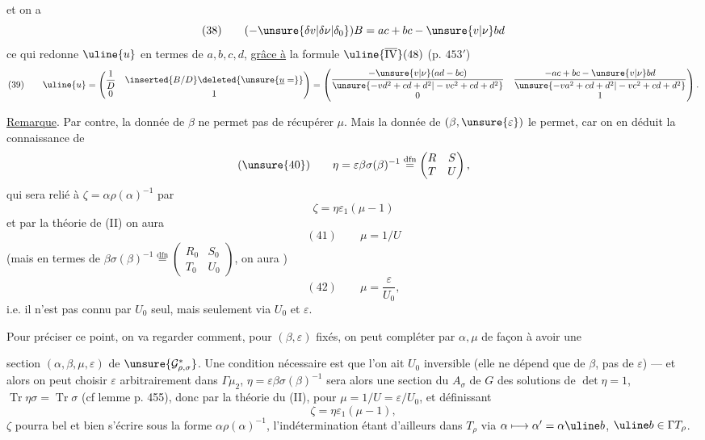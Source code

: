 et on a
\[
(38)\qquad (-\unsure{\delta v|\delta\nu|\delta_0})B=ac+bc-\unsure{v|\nu}bd
\]
ce qui redonne $\uline{u}$ en termes de $a,b,c,d$, \uline{grâce à} la formule $\uline{\overline{\mathrm{IV}}}(48)$ (p. $453'$)
\[
(39)\qquad \uline{u}=\begin{pmatrix}\dfrac1D&\inserted{B/D}\deleted{\unsure{\underline u=}}\\0&1\end{pmatrix}
=\begin{pmatrix}
\dfrac{-\unsure{v|\nu}(ad-bc)}{\unsure{-vd^2+cd+d^2|-vc^2+cd+d^2}}&\dfrac{-ac+bc-\unsure{v|\nu}bd}{\unsure{-va^2+cd+d^2|-vc^2+cd+d^2}}\\0&1
\end{pmatrix}.
\]

\uline{Remarque}. Par contre, la donnée de $\beta$   ne permet pas de récupérer $\mu$. Mais la donnée de $(\beta,\unsure{\varepsilon})$ le permet, car on en déduit la connaissance de
\[
(\unsure{40})\qquad \eta=\varepsilon\beta\sigma(\beta)^{-1}\overset{\mathrm{dfn}}=\begin{pmatrix}R&S\\T&U\end{pmatrix},
\]
qui sera relié à $\zeta=\alpha\rho(\alpha)^{-1}$ par
\[
\zeta=\eta\varepsilon_1(\mu-1)
\]
et par la théorie de (II) on aura
\[
(41)\qquad \mu=1/U
\]
(mais en termes de $\beta\sigma(\beta)^{-1}\overset{\mathrm{dfn}}=\begin{pmatrix}R_0&S_0\\T_0&U_0\end{pmatrix}$,
on aura )
\[
(42)\qquad \mu=\frac{\varepsilon}{U_0},
\]
i.e. il n'est  pas connu par $U_0$ seul, mais seulement via $U_0$ et $\varepsilon$. 

Pour préciser ce point, on va regarder  comment, pour $(\beta,\varepsilon)$ fixés, on peut compléter par $\alpha,\mu$ de façon à avoir une

section $(\alpha,\beta,\mu,\varepsilon)$ de $\unsure{\mathcal G^{*}_{\rho,\sigma}}$. Une condition nécessaire est que l'on ait $U_0$ inversible (elle ne dépend que de $\beta$, pas de $\varepsilon$) --- et alors on peut choisir $\varepsilon$ arbitrairement dans $\Gamma\mu_2$,  $\eta=\varepsilon\beta\sigma(\beta)^{-1}$ sera alors une section du  $A_\sigma$  de $G$ des solutions de $\det\eta=1$, $\operatorname{Tr}\eta\sigma=\operatorname{Tr}\sigma$ (cf lemme p. 455), donc par la théorie du (II), pour  $\mu=1/U=\varepsilon/U_0$,  et définissant
\[
\zeta=\eta\varepsilon_1(\mu-1),
\]
$\zeta$ pourra bel et bien s'écrire  sous la forme $\alpha\rho(\alpha)^{-1}$, l'indétermination étant d'ailleurs dans $T_\rho$ via $\alpha\longmapsto\alpha'=\alpha\uline b$, $\uline b\in\Gamma T_\rho$.

